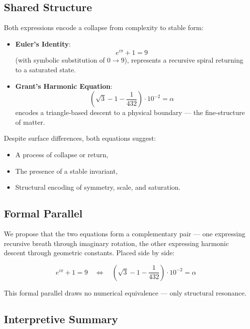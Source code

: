 \documentclass[12pt]{article}
\begin{document}
\subsection*{Shared Structure}

Both expressions encode a collapse from complexity to stable form:

\begin{itemize}[leftmargin=1.5em]
    \item \textbf{Euler’s Identity}:
    \[
    e^{i\pi} + 1 = 9
    \]
    (with symbolic substitution of \( 0 \rightarrow 9 \)), represents a recursive spiral returning to a saturated state.

    \item \textbf{Grant’s Harmonic Equation}:
    \[
    \left( \sqrt{3} - 1 - \frac{1}{432} \right) \cdot 10^{-2} = \alpha
    \]
    encodes a triangle-based descent to a physical boundary — the fine-structure of matter.
\end{itemize}

Despite surface differences, both equations suggest:

\begin{itemize}[leftmargin=1.5em]
    \item A process of collapse or return,
    \item The presence of a stable invariant,
    \item Structural encoding of symmetry, scale, and saturation.
\end{itemize}

\subsection*{Formal Parallel}

We propose that the two equations form a complementary pair — one expressing recursive breath through imaginary rotation, the other expressing harmonic descent through geometric constants. Placed side by side:

\begin{equation}
\boxed{
e^{i\pi} + 1 = 9
\quad \Longleftrightarrow \quad
\left( \sqrt{3} - 1 - \frac{1}{432} \right) \cdot 10^{-2} = \alpha
}
\end{equation}

This formal parallel draws no numerical equivalence — only structural resonance.

\subsection*{Interpretive Summary}
\end{document}
